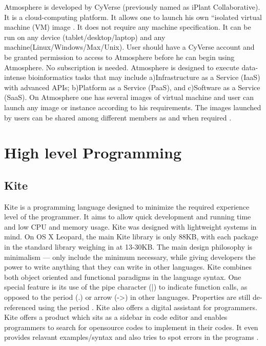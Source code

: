      Atmosphere is developed by CyVerse (previously named as iPlant
     Collaborative).  It is a cloud-computing platform. It allows one
     to launch his own ``isolated virtual machine (VM) image
     \cite{www-at1}.  It does not require any machine
     specification. It can be run on any device
     (tablet/desktop/laptop) and any machine(Linux/Windows/Max/Unix).
     User should have a CyVerse account and be granted permission to
     access to Atmosphere before he can begin using Atmosphere. No
     subscription is needed.  Atmosphere is designed to execute
     data-intense bioinformatics tasks that may include
     a)Infrastructure as a Service (IaaS) with advanced APIs;
     b)Platform as a Service (PaaS), and c)Software as a Service
     (SaaS).  On Atmosphere one has several images of virtual machine
     and user can launch any image or instance according to his
     requirements.  The images launched by users can be shared among
     different members as and when required \cite{www-at2}.

\section{High level Programming}

\subsection{ Kite}

     Kite is a programming language designed to minimize the required
     experience level of the programmer.  It aims to allow quick
     development and running time and low CPU and memory usage. Kite
     was designed with lightweight systems in mind.  On OS X Leopard,
     the main Kite library is only 88KB, with each package in the
     standard library weighing in at 13-30KB. The main design
     philosophy is minimalism — only include the minimum necessary,
     while giving developers the power to write anything that they can
     write in other languages. Kite combines both object oriented and
     functional paradigms in the language syntax.  One special feature
     is its use of the pipe character (|) to indicate function calls,
     as opposed to the period (.) or arrow (->) in other languages.
     Properties are still de-referenced using the period
     \cite{kite-devtopics}. Kite also offers a digital assistant for
     programmers. Kite offers a product which sits as a sidebar in
     code editor and enables programmers to search for opensource
     codes to implement in their codes. It even provides relavant
     examples/syntax and also tries to spot errors in the programs
     \cite{kite-wired}.
	   
